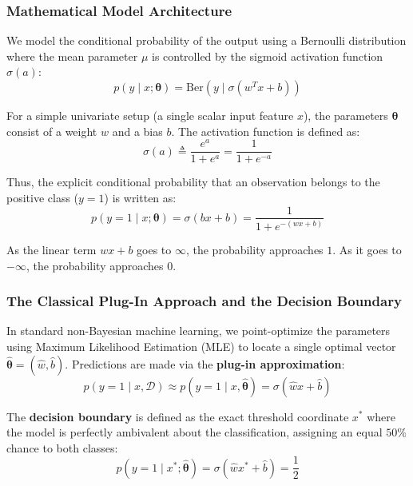 \documentclass{article}
\begin{document}
\subsubsection{Mathematical Model Architecture}
We model the conditional probability of the output using a Bernoulli distribution where the mean parameter $\mu$ is controlled by the sigmoid activation function $\sigma(a)$:
\begin{equation}
p(y \mid x; \boldsymbol{\theta}) = \text{Ber}(y \mid \sigma(w^T x + b))
\end{equation}

For a simple univariate setup (a single scalar input feature $x$), the parameters $\boldsymbol{\theta}$ consist of a weight $w$ and a bias $b$. The activation function is defined as:
\begin{equation}
\sigma(a) \triangleq \frac{e^a}{1 + e^a} = \frac{1}{1 + e^{-a}}
\end{equation}

Thus, the explicit conditional probability that an observation belongs to the positive class ($y=1$) is written as:
\begin{equation}
p(y = 1 \mid x; \boldsymbol{\theta}) = \sigma(bx + b) = \frac{1}{1 + e^{-(wx + b)}}
\end{equation}

As the linear term $wx + b$ goes to $\infty$, the probability approaches $1$. As it goes to $-\infty$, the probability approaches $0$.

\subsubsection{The Classical Plug-In Approach and the Decision Boundary}
In standard non-Bayesian machine learning, we point-optimize the parameters using Maximum Likelihood Estimation (MLE) to locate a single optimal vector $\hat{\boldsymbol{\theta}} = (\hat{w}, \hat{b})$. Predictions are made via the \textbf{plug-in approximation}:
\begin{equation}
p(y = 1 \mid x, \mathcal{D}) \approx p(y = 1 \mid x, \hat{\boldsymbol{\theta}}) = \sigma(\hat{w}x + \hat{b})
\end{equation}

The \textbf{decision boundary} is defined as the exact threshold coordinate $x^*$ where the model is perfectly ambivalent about the classification, assigning an equal $50\%$ chance to both classes:
\begin{equation}
p(y = 1 \mid x^*; \hat{\boldsymbol{\theta}}) = \sigma(\hat{w}x^* + \hat{b}) = \frac{1}{2}
\end{equation}
\end{document}
